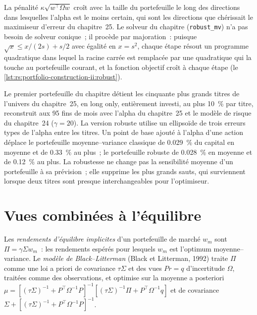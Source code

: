 La pénalité $\kappa\sqrt{w^\top\Omega w}$ croît avec la taille du portefeuille le long des directions dans lesquelles l'alpha est le moins certain, qui sont les directions
que chérissait le maximiseur d'erreur du chapitre~25. Le solveur du chapitre (\texttt{robust\_mv}) n'a pas besoin de solveur conique~; il procède par majoration~: puisque $\sqrt x \le x/(2s) + s/2$
avec égalité en $x = s^2$, chaque étape résout un programme quadratique dans lequel la racine carrée est remplacée par une quadratique qui la touche au portefeuille courant, et la
fonction objectif croît à chaque étape (le \cref{lst:rs:portfolio-construction-ii:robust}).

Le premier portefeuille du chapitre détient les cinquante plus grands titres de l'univers du chapitre~25, en long only, entièrement investi, au plus 10~\% par titre, reconstruit aux 95
fins de mois avec l'alpha du chapitre~25 et le modèle de risque du chapitre~24 ($\gamma = 20$). La version robuste utilise un ellipsoïde de trois erreurs types de l'alpha
entre les titres. Un point de base ajouté à l'alpha d'une action déplace le portefeuille moyenne--variance classique de 0.029~\% du capital en moyenne et de 0.33~\% au plus~; le
portefeuille robuste de 0.028~\% en moyenne et de 0.12~\% au plus. La robustesse ne change pas la sensibilité moyenne d'un portefeuille à sa prévision~; elle supprime les plus grands sauts,
qui surviennent lorsque deux titres sont presque interchangeables pour l'optimiseur.

\section{Vues combinées à l'équilibre}

\begin{definition}\label{def:rs:portfolio-construction-ii:bl}
Les \emph{rendements d'équilibre implicites} d'un portefeuille de marché $w_m$ sont $\Pi = \gamma\Sigma w_m$~: les rendements espérés pour
lesquels $w_m$ est l'optimum moyenne--variance. Le \emph{modèle de Black--Litterman} (Black et Litterman, 1992) traite $\Pi$ comme une loi a priori
de covariance $\tau\Sigma$ et des vues $Pr = q$ d'incertitude $\Omega$, traitées comme des observations, et optimise sur la moyenne a posteriori
$\mu = [(\tau\Sigma)^{-1} + P^\top\Omega^{-1}P]^{-1}[(\tau\Sigma)^{-1}\Pi + P^\top\Omega^{-1}q]$ et de covariance $\Sigma + [(\tau\Sigma)^{-1} + P^\top\Omega^{-1}P]^{-1}$.
\end{definition}

